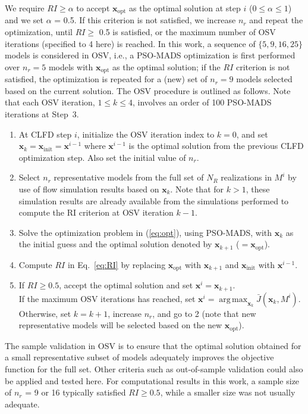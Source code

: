 \documentclass[11pt]{article}
\DeclareMathOperator*{\argmax}{arg\,max}
\begin{document}
We require $RI\ge \alpha$ to accept $\mathbf{x}_{\text{opt}}$ as the optimal solution at step $i$ ($0 \le \alpha \le 1$)
and we set $\alpha$ = 0.5.
If this criterion is not satisfied, we increase $n_r$
and repeat the optimization, until $RI\ge$ 0.5 is satisfied, or the maximum number of OSV iterations (specified to 4 here) is reached.
In this work, a sequence of $\{5, 9, 16, 25\}$  models is considered in OSV, i.e.,
a PSO-MADS optimization is first performed over $n_r=5$ models with $\mathbf{x}_{\text{opt}}$ as the optimal solution;
if the $RI$ criterion is not satisfied, the optimization is repeated for a (new) set of  $n_r=9$  models selected based on the current solution.
The OSV procedure is outlined as follows.
Note that each OSV iteration, $1\le k \le4$, involves an order of 100 PSO-MADS iterations at Step~3.
%
\begin{enumerate}
\item At CLFD step $i$, initialize the OSV iteration index to $k=0$, and set $\mathbf{x}_k = \mathbf{x}_{\text{init}} = \mathbf{x}^{i-1}$ where $\mathbf{x}^{i-1}$
is the optimal solution from the previous CLFD optimization step.
Also set the initial value of $n_r$.
\item Select $n_r$ representative models from the full set of $N_R$ realizations in $M^i$ by use of flow simulation results based on $\mathbf{x}_k$.
Note that for $k > 1$, these simulation results are already available from the simulations performed to compute the RI criterion at OSV iteration $k-1$.
\item Solve the optimization problem in (\ref{eq:opt}), using PSO-MADS, with $\mathbf{x}_k$ as the initial guess and the optimal solution denoted by $\mathbf{x}_{k+1}$ ($=\mathbf{x}_{\text{opt}}$).
\item Compute $RI$ in Eq.~\ref{eq:RI} by replacing $\mathbf{x}_{\text{opt}}$ with $\mathbf{x}_{k+1}$ and $\mathbf{x}_{\text{init}}$  with $\mathbf{x}^{i-1}$.
\item If $RI\ge 0.5$, accept the optimal solution and set $\mathbf{x}^i=\mathbf{x}_{k+1}$.\\
If the maximum OSV iterations has reached, set $\mathbf{x}^i = \argmax_{\mathbf{x}_{k}}{\bar{J}(\mathbf{x}_{k},M^i)}$.
Otherwise, set $k=k+1$, increase $n_r$, and go to 2 (note that new representative models will be selected
based on the new $\mathbf{x}_{\text{opt}}$).
\end{enumerate}

The sample validation in OSV is to ensure that the optimal solution obtained for a small representative subset of models
adequately improves the objective function for the full set.
Other criteria such as out-of-sample validation could also be applied and tested here.
For computational results in this work, a sample size of $n_r$ = 9 or 16 typically satisfied $RI\ge 0.5$, while
a smaller size was not usually adequate.
\end{document}
